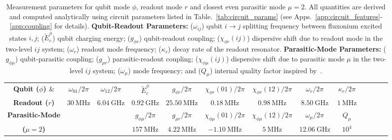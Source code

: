 \documentclass[%
reprint,
superscriptaddress,
 amsmath,amssymb,
 aps,
 prx,
longbibliography,
floatfix,
]{revtex4-2}
\begin{document}
\begin{table}[tb]
    \centering
\begin{tabular}{|c|c|c|c|c|c|c|c|c|c|c|c|c|}
    \hline
    \textbf{Qubit ($\phi$) $\&$}&$\omega_{01}/2\pi$&$\omega_{12}/2\pi$ &$\tilde{E}^\phi_c$ &$g_{\phi r}/2\pi$&$\chi_{\phi r}(01)/2\pi$&$\chi_{\phi r}(12)/2\pi$&$\omega_r/2\pi$&$\kappa_r/2\pi$\\
    \cline{2-9}
\textbf{Readout ($r$)}&$30 \ \mathrm{MHz}$& $6.04 \ \mathrm{GHz}$ & $0.92 \ \mathrm{GHz}$& $25.50 \ \mathrm{MHz}$& $0.18 \ \mathrm{MHz}$&$0.98 \ \mathrm{MHz}$&$8.50 \ \mathrm{GHz}$&$1 \ \mathrm{MHz}$\\    
\hline\textbf{Parasitic-Mode} & \multicolumn{2}{c|}{} & $g_{\phi\mu}/2\pi$&$g_{\mu r}/2\pi$&$\chi_{\phi\mu}(01)/2\pi$&$\chi_{\phi\mu}(12)/2\pi$&$\omega_\mu/2\pi$&$Q_\mu$\\
    \cline{4-9}
\textbf{($\mu=2$)}&\multicolumn{2}{c|}{} &$157 \ \mathrm{MHz}$& $4.22 \ \mathrm{MHz}$& $-1.10 \ \mathrm{MHz}$& $5 \ \mathrm{MHz}$& $12.06 \ \mathrm{GHz}$&$10^{4}$\\    
\hline
\end{tabular}
\caption{Measurement parameters for qubit mode $\phi$, readout mode $r$ and closest even parasitic mode $\mu=2$.  All quantities are derived and computed analytically using circuit parameters listed in Table.~\ref{tab:circuit_params} (see Apps.~\ref{app:circuit_features}-\ref{app:coupling} for details). \textbf{Qubit-Readout Parameters:} ($\omega_{ij}$) qubit $i\rightarrow j$ splitting frequency between fluxonium excited states $i, j$; ($\tilde{E}^\phi_c$) qubit charging energy; ($g_{\phi r}$) qubit-readout coupling; ($\chi_{\phi r}(ij)$) dispersive shift due to readout mode in the two-level $ij$ system; ($\omega_r$) readout mode frequency; ($\kappa_r$) decay rate of the readout resonator. \textbf{Parasitic-Mode Parameters:} ($g_{\phi \mu}$) qubit-parasitic coupling; ($g_{\mu r}$) parasitic-readout coupling; ($\chi_{\phi \mu}(ij)$) dispersive shift due to parasitic mode $\mu$ in the two-level $ij$ system; ($\omega_\mu$) mode frequency; and ($Q_\mu$) internal quality factor inspired by~\cite{masluk_microwave_2012}.}   \label{tab:readout_params}
\end{table}



\end{document}

